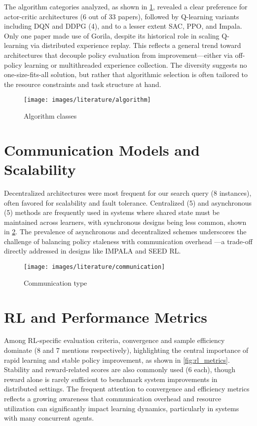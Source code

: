 The algorithm categories analyzed, as shown in \cref{fig:algorithm}, revealed a clear preference for actor-critic architectures (6 out of 33 papers),
followed by Q-learning variants including DQN and DDPG (4), and to a lesser extent SAC, PPO, and Impala.
Only one paper made use of Gorila, despite its historical role in scaling Q-learning via distributed experience replay.
This reflects a general trend toward architectures that decouple policy evaluation from improvement—either via off-policy learning or multithreaded experience collection.
The diversity suggests no one-size-fits-all solution, but rather that algorithmic selection is often tailored to the resource constraints and task structure at hand.

\begin{figure}
    \centering
    \texttt{[image: images/literature/algorithm]}
    \caption{Algorithm classes}
    \label{fig:algorithm}
\end{figure}

\section{Communication Models and Scalability}
\label{sec:communication-models-and-scalability}

Decentralized architectures were most frequent for our search query (8 instances), often favored for scalability and fault tolerance.
Centralized (5) and asynchronous (5) methods are frequently used in systems where shared state must be maintained across learners,
with synchronous designs being less common, shown in \cref{fig:communication_type}.
The prevalence of asynchronous and decentralized schemes underscores the challenge of balancing policy staleness with communication overhead
—a trade-off directly addressed in designs like IMPALA and SEED RL.

\begin{figure}
    \centering
    \texttt{[image: images/literature/communication]}
    \caption{Communication type}
    \label{fig:communication_type}
\end{figure}

\section{RL and Performance Metrics}
\label{sec:rl-and-performance-metrics}

Among RL-specific evaluation criteria, convergence and sample efficiency dominate (8 and 7 mentions respectively),
highlighting the central importance of rapid learning and stable policy improvement, as shown in \cref{fig:rl_metrics}.
Stability and reward-related scores are also commonly used (6 each), though reward alone is rarely sufficient to benchmark system improvements in distributed settings.
The frequent attention to convergence and efficiency metrics reflects a growing awareness that communication overhead and resource utilization can significantly
impact learning dynamics, particularly in systems with many concurrent agents.

